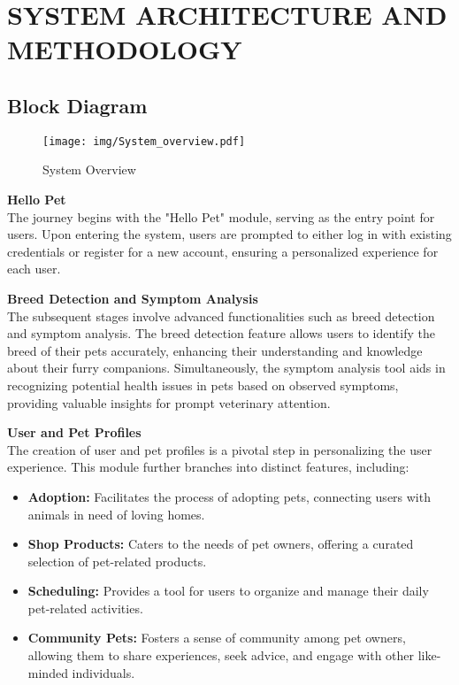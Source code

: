 \section{SYSTEM ARCHITECTURE AND METHODOLOGY }
\subsection{Block Diagram}

\justify
\vspace{.5cm}
\begin{figure}[H]
\centering
\texttt{[image: img/System\_overview.pdf]}
\caption{System Overview}
\label{fig:system-overview}
\end{figure}

  \textbf{Hello Pet}\\ The journey begins with the "Hello Pet" module, serving as the entry point for users. Upon entering the system, users are prompted to either log in with existing credentials or register for a new account, ensuring a personalized experience for each user.

 \noindent \textbf{Breed Detection and Symptom Analysis}\\ The subsequent stages involve advanced functionalities such as breed detection and symptom analysis. The breed detection feature allows users to identify the breed of their pets accurately, enhancing their understanding and knowledge about their furry companions. Simultaneously, the symptom analysis tool aids in recognizing potential health issues in pets based on observed symptoms, providing valuable insights for prompt veterinary attention.

\noindent  \textbf{User and Pet Profiles}\\ The creation of user and pet profiles is a pivotal step in personalizing the user experience. This module further branches into distinct features, including:
  \begin{itemize}
    \item \textbf{Adoption:} Facilitates the process of adopting pets, connecting users with animals in need of loving homes.
    \item \textbf{Shop Products:} Caters to the needs of pet owners, offering a curated selection of pet-related products.
    \item \textbf{Scheduling:} Provides a tool for users to organize and manage their daily pet-related activities.
    \item \textbf{Community Pets:} Fosters a sense of community among pet owners, allowing them to share experiences, seek advice, and engage with other like-minded individuals.
  \end{itemize}



